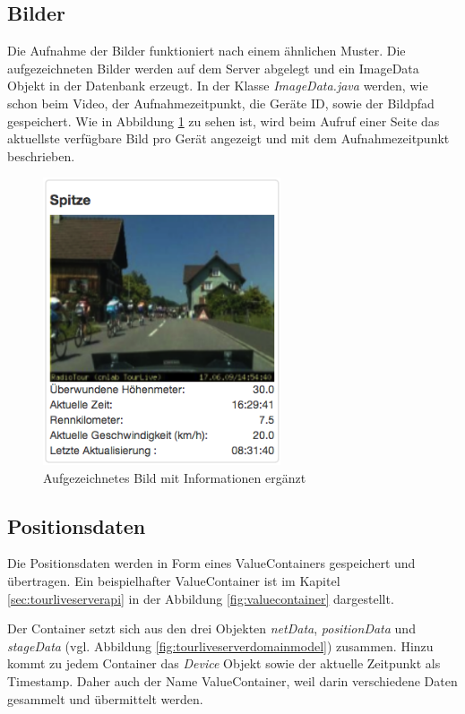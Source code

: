 \subsection{Bilder}
Die Aufnahme der Bilder funktioniert nach einem ähnlichen Muster. Die aufgezeichneten Bilder werden auf dem Server abgelegt und ein ImageData Objekt in der Datenbank erzeugt. In der Klasse \textit{ImageData.java} werden, wie schon beim Video, der Aufnahmezeitpunkt, die Geräte ID, sowie der Bildpfad gespeichert. Wie in Abbildung \ref{fig:bildaufzeichnung} zu sehen ist, wird beim Aufruf einer Seite das aktuellste verfügbare Bild pro Gerät angezeigt und mit dem Aufnahmezeitpunkt beschrieben.
\begin{figure}[H]
	\centering
	\includegraphics[width=70mm]{images/tourliveweb/bildaufzeichnung.png}
	\caption{Aufgezeichnetes Bild mit Informationen ergänzt}
	\label{fig:bildaufzeichnung}
\end{figure}

\subsection{Positionsdaten}
Die Positionsdaten werden in Form eines ValueContainers gespeichert und übertragen. Ein beispielhafter ValueContainer ist im Kapitel \ref{sec:tourliveserverapi} in der Abbildung \ref{fig:valuecontainer} dargestellt.

Der Container setzt sich aus den drei Objekten \textit{netData}, \textit{positionData} und \textit{stageData} (vgl. Abbildung \ref{fig:tourliveserverdomainmodel}) zusammen. Hinzu kommt zu jedem Container das \textit{Device} Objekt sowie der aktuelle Zeitpunkt als Timestamp. Daher auch der Name ValueContainer, weil darin verschiedene Daten gesammelt und übermittelt werden.

